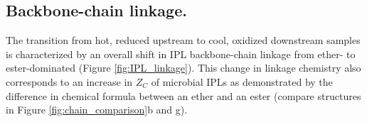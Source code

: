 

\subsection{Backbone-chain linkage.} The transition from hot, reduced upstream to cool, oxidized downstream samples is characterized by an overall shift in IPL backbone-chain linkage from ether- to ester-dominated (Figure \ref{fig:IPL_linkage}). This change in linkage chemistry also corresponds to an increase in $Z_{C}$ of microbial IPLs as demonstrated by the difference in chemical formula between an ether and an ester (compare structures in Figure \ref{fig:chain_comparison}b and g).



